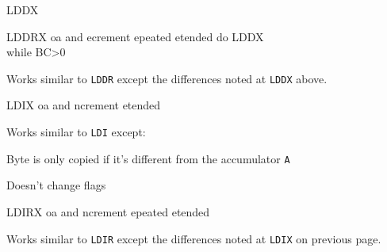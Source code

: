 \documentclass[12pt,twoside,openright,a4paper]{book}
\begin{document}
\begin{basedescript}{
	\desclabelstyle{\multilinelabel}
	\desclabelwidth{3cm}}
\begin{DetailItem}{LDDX\ZXN}
		\begin{DetailTiming}
		\end{DetailTiming}

	\end{DetailItem}

	\label{DetailRefLDDRX}
	\begin{DetailItem}{LDDRX\ZXN}
		{oa\IH{D} and ecrement epeated etended}		
		{do LDDX\\
		while BC>0}

		Works similar to {\tt LDDR} except the differences noted at {\tt LDDX} above.

		\begin{DetailEffects}
			\FlagsLDDRX
		\end{DetailEffects}
					
		\begin{DetailTiming}
			\DetailTimeRegular[{\tt BC}=0]{4}{16}
			\DetailTimeRegular[{\tt BC}$\neq$0]{5}{21}
		\end{DetailTiming}

	\end{DetailItem}

	\label{DetailRefLDIX}
	\begin{DetailItem}{LDIX\ZXN}
		{oa and ncrement etended}		
		{\SymLDIX}

		Works similar to {\tt LDI} except:
		\begin{DetailCompactList}
			\item Byte is only copied if it's different from the accumulator {\tt A}
			\item Doesn't change flags
		\end{DetailCompactList}

		\begin{DetailEffects}
			\FlagsLDIX
		\end{DetailEffects}
				
		\begin{DetailTiming}
			\DetailTime{4}{16}
		\end{DetailTiming}

	\end{DetailItem}

	\label{DetailRefLDIRX}
	\begin{DetailItem}{LDIRX\ZXN}
		{oa and ncrement epeated etended}		
		{\SymLDIRX}

		Works similar to {\tt LDIR} except the differences noted at {\tt LDIX} on previous page.


\end{DetailItem}
\end{basedescript}
\end{document}
